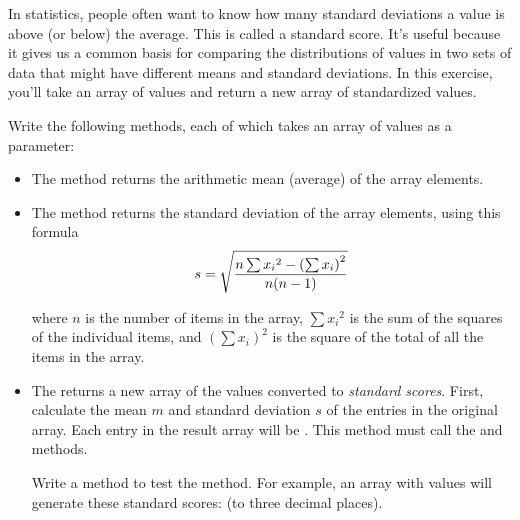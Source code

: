 \begin{exercise}
\label{ex:standardize}
In statistics, people often want to know how many standard deviations a value is above (or below) the average. This is called a standard score. It's useful because it gives us a common basis for comparing the distributions of values in two sets of data that might have different means and standard deviations. In this exercise, you'll take an array of values and return a new array of standardized values.

Write the following methods, each of which takes an array of  values as a parameter:

\begin{itemize}
\item The  method returns the arithmetic mean (average) of the array elements.

\item The  method returns the standard deviation of the array elements, using this formula
\begin{equation*}
s = \sqrt {{n \sum{x_i} ^2 - \left(\sum{x_i}\right)^2} \over {n (n - 1)}}
\end{equation*}

where $n$ is the number of items in the array, $\sum{x_i} ^2$ is the sum of the squares of the individual items, and $\left(\sum{x_i}\right)^2$ is the square of the total of all the items in the array.

\item The  returns a new array of the values converted to {\em standard scores}. First, calculate the mean $m$ and standard deviation $s$ of the entries in the original array. Each entry in the result array will be . This method must call the  and  methods.

Write a  method to test the  method. For example, an array with values
 will generate these standard scores:  (to three decimal places). 

\end{itemize}
\end{exercise}

